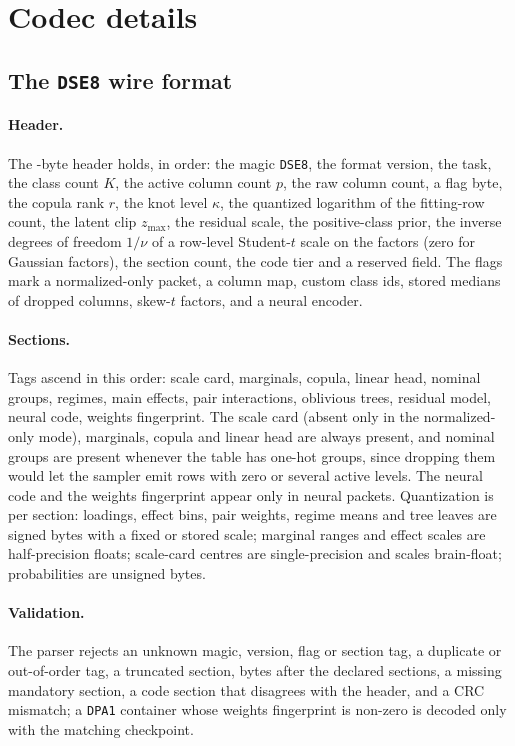 \section{Codec details}\label{app:codec}

\subsection{The \texttt{DSE8} wire format}

\paragraph{Header.}
The -byte header holds, in order: the magic \texttt{DSE8}, the format version, the task, the class count $K$, the active column count $p$, the raw column count, a flag byte, the copula rank $r$, the knot level $\kappa$, the quantized logarithm of the fitting-row count, the latent clip $z_{\max}$, the residual scale, the positive-class prior, the inverse degrees of freedom $1/\nu$ of a row-level Student-$t$ scale on the factors (zero for Gaussian factors), the section count, the code tier and a reserved field.
The flags mark a normalized-only packet, a column map, custom class ids, stored medians of dropped columns, skew-$t$ factors, and a neural encoder.

\paragraph{Sections.}
Tags ascend in this order: scale card, marginals, copula, linear head, nominal groups, regimes, main effects, pair interactions, oblivious trees, residual model, neural code, weights fingerprint.
The scale card (absent only in the normalized-only mode), marginals, copula and linear head are always present, and nominal groups are present whenever the table has one-hot groups, since dropping them would let the sampler emit rows with zero or several active levels.
The neural code and the weights fingerprint appear only in neural packets.
Quantization is per section: loadings, effect bins, pair weights, regime means and tree leaves are signed bytes with a fixed or stored scale; marginal ranges and effect scales are half-precision floats; scale-card centres are single-precision and scales brain-float; probabilities are unsigned bytes.

\paragraph{Validation.}
The parser rejects an unknown magic, version, flag or section tag, a duplicate or out-of-order tag, a truncated section, bytes after the declared sections, a missing mandatory section, a code section that disagrees with the header, and a CRC mismatch; a \texttt{DPA1} container whose weights fingerprint is non-zero is decoded only with the matching checkpoint.


